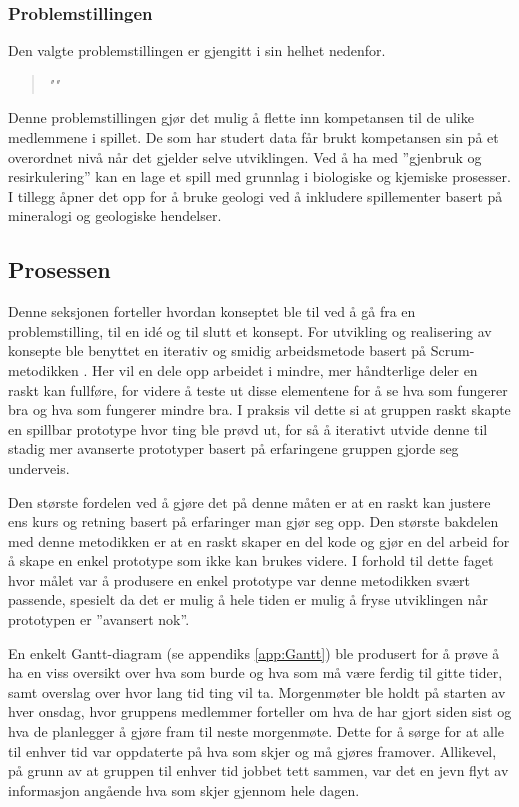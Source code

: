 \subsubsection{Problemstillingen}\label{sec:problemstilling}
Den valgte problemstillingen er gjengitt i sin helhet nedenfor.
\begin{quotation}
\large\emph{""}
\end{quotation}
Denne problemstillingen gjør det mulig å flette inn kompetansen til de
ulike medlemmene i spillet. De som har studert data får brukt
kompetansen sin på et overordnet nivå når det gjelder selve utviklingen.
Ved å ha med ''gjenbruk og resirkulering'' kan en lage et spill med
grunnlag i biologiske og kjemiske prosesser. I tillegg åpner det opp for å bruke geologi ved å inkludere spillementer basert på mineralogi og geologiske hendelser. 

\subsection{Prosessen}
Denne seksjonen forteller hvordan konseptet ble til ved å gå fra en problemstilling, til en idé og til slutt et konsept. For utvikling og realisering av konsepte ble benyttet en iterativ og smidig arbeidsmetode \cite{online:agile_manifesto} basert på Scrum-metodikken \cite{Scrum}. Her vil en dele opp arbeidet i mindre, mer håndterlige deler en raskt kan fullføre, for videre å teste ut disse elementene for å se hva som fungerer bra og hva som fungerer mindre bra. I praksis vil dette si at gruppen raskt skapte en spillbar prototype hvor ting ble prøvd ut, for så å iterativt utvide denne til stadig mer avanserte prototyper basert på erfaringene gruppen gjorde seg underveis.

Den største fordelen ved å gjøre det på denne måten er at en raskt kan justere ens kurs og retning basert på erfaringer man gjør seg opp. 
Den største bakdelen med denne metodikken er at en raskt skaper en del kode og gjør en del arbeid for å skape en enkel prototype som ikke kan brukes videre.
I forhold til dette faget hvor målet var å produsere en enkel prototype var denne metodikken svært passende, spesielt da det er mulig å hele tiden er mulig å fryse utviklingen når prototypen er ''avansert nok''.


En enkelt Gantt-diagram (se appendiks \ref{app:Gantt}) ble produsert for å prøve å ha en viss oversikt over hva som burde og hva som må være ferdig til gitte tider, samt overslag over hvor lang tid ting vil ta.
Morgenmøter ble holdt på starten av hver onsdag, hvor gruppens medlemmer forteller om hva de har gjort siden sist og hva de planlegger å gjøre fram til neste morgenmøte. Dette for å sørge for at alle til enhver tid var oppdaterte på hva som skjer og må gjøres framover.
Allikevel, på grunn av at gruppen til enhver tid jobbet tett sammen, var det en jevn flyt av informasjon angående hva som skjer gjennom hele dagen.


